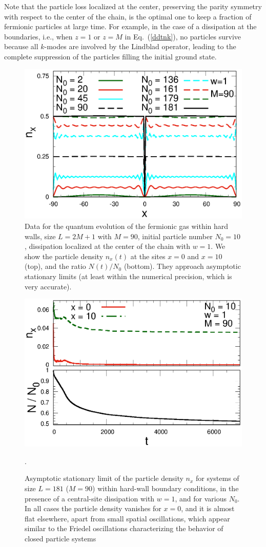   Note that the particle loss localized at the center, preserving the
  parity symmetry with respect to the center of the chain, is the
  optimal one to keep a fraction of fermionic particles at large time.
  For example, in the case of a dissipation at the boundaries, i.e.,
  when $z=1$ or $z=M$ in Eq.~(\ref{ddtnk}), no particles survive because
  all $k$-modes are involved by the Lindblad operator, leading to the
  complete suppression of the particles filling the initial ground
  state.
  
  \begin{figure}[!htb]
\centering
    \includegraphics[width=0.65\columnwidth]{imm/nxhwall.eps}
    \caption{Data for the quantum evolution of the fermionic gas within
      hard walls, size $L=2M+1$ with $M=90$, initial particle number
      $N_0=10$, dissipation localized at the center of the chain with
      $w=1$. We show the particle density $n_x(t)$ at the sites $x=0$
      and $x=10$ (top), and the ratio $N(t)/N_0$ (bottom).  They
      approach asymptotic stationary limits (at least within the
      numerical precision, which is very accurate).}
    \label{nxdiffn0time}
  \end{figure}

  
  \begin{figure}[!htb]
\centering
    \includegraphics[width=0.65\columnwidth]{imm/nxNo.eps}
    \caption{Asymptotic stationary limit of the particle density $n_x$
      for systems of size $L=181$ ($M=90$) within hard-wall boundary
      conditions, in the presence of a central-site dissipation with
      $w=1$, and for various $N_0$. In all cases the particle density
      vanishes for $x=0$, and it is almost flat elsewhere, apart from
      small spatial oscillations, which appear similar to the
        Friedel oscillations characterizing the behavior of closed
        particle systems}.
    \label{nxdiffn0}
  \end{figure}
  

